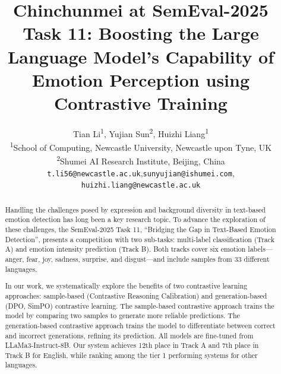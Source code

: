 \documentclass[11pt]{article}
\title{Chinchunmei at SemEval-2025 Task 11: Boosting the Large Language Model's Capability of Emotion Perception using Contrastive Training}
\author{
  Tian Li\textsuperscript{1},
  Yujian Sun\textsuperscript{2},
  Huizhi Liang\textsuperscript{1}
\\
  \textsuperscript{1}School of Computing, Newcastle University, Newcastle upon Tyne, UK\\
  \textsuperscript{2}Shumei AI Research Institute, Beijing, China
\\
  \texttt{t.li56@newcastle.ac.uk},\texttt{sunyujian@ishumei.com},\\\texttt{huizhi.liang@newcastle.ac.uk}
}
\begin{document}
\maketitle
\begin{abstract}

Handling the challenges posed by expression and background diversity in text-based emotion detection has long been a key research topic. To advance the exploration of these challenges, the SemEval-2025 Task 11, “Bridging the Gap in Text-Based Emotion Detection”, presents a competition with two sub-tasks: multi-label classification (Track A) and emotion intensity prediction (Track B). Both tracks cover six emotion labels—anger, fear, joy, sadness, surprise, and disgust—and include samples from 33 different languages.

In our work, we systematically explore the benefits of two contrastive learning approaches: sample-based (Contrastive Reasoning Calibration) and generation-based (DPO, SimPO) contrastive learning. The sample-based contrastive approach trains the model by comparing two samples to generate more reliable predictions. The generation-based contrastive approach trains the model to differentiate between correct and incorrect generations, refining its prediction. All models are fine-tuned from LLaMa3-Instruct-8B. Our system achieves 12th place in Track A and 7th place in Track B for English, while ranking among the tier 1 performing systems for other languages.

\end{abstract}
\end{document}
